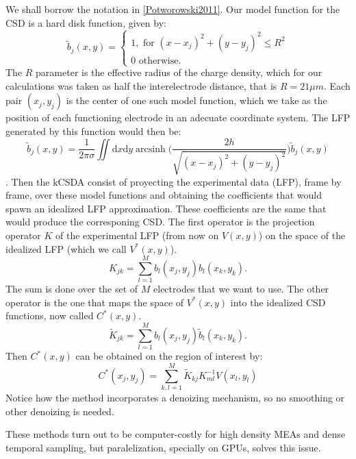 \documentclass{article}
\DeclareMathOperator{\arcsinh}{arcsinh}
\newcommand{\rd}{\mathrm{d}}
\begin{document}
We shall borrow the notation in \ref{Potworowski2011}. Our model function for the CSD is a hard disk function, given by:
\begin{equation}
  \tilde{b}_j(x,y)=\begin{cases}
  1, \text{ for } (x-x_j)^2+(y-y_j)^2 \leq R^2 \\
  0 \text{ otherwise.}
  \end{cases}
\end{equation}
The $R$ parameter is the effective radius of the charge density, which for our
calculations was taken as half the interelectrode distance, that is $R=21 \mu m$.
Each pair $(x_j, y_j)$ is the center of one such model function, which we take as
the position of each  functioning electrode in an adecuate coordinate system.
The LFP generated by this function would then be:
\begin{equation}
  \tilde{b}_j(x,y)=\frac{1}{2\pi\sigma}
  \iint \! \rd x \rd y \arcsinh \biggr(
  \frac{2 h } {\sqrt{(x-x_j)^2+(y-y_j)^2}}
  \biggl)
  \tilde{b}_j(x,y)
\end{equation}.
Then the kCSDA consist of proyecting the experimental data (LFP), frame by frame,
over these model functions and obtaining the  coefficients that would spawn an idealized
LFP approximation. These coefficients are the same that would produce the
corresponing CSD. The first operator is the projection operator $K$ of the experimental
LFP (from now on $V(x,y)$) on the space of the idealized LFP (which we call $V^* (x,y)$).
\begin{equation}
  K_{jk}=\sum_{l=1}^{M}b_l(x_j,y_j)b_l(x_k,y_k).
\end{equation}
The sum is done over the set of $M$ electrodes that we want to use.
The other operator is the one that maps the space of $V^*(x,y)$ into the idealized
CSD functions, now called $C^*(x,y)$. 
\begin{equation}
  \tilde{K}_{jk}=\sum_{l=1}^Mb_l(x_j,y_j)\tilde{b}_l(x_k,y_k).
\end{equation}
Then $C^*(x,y)$ can be obtained on the region of interest by:
\begin{equation}
  C^*(x_j,y_j)=\sum_{k,l=1}^M \tilde{K}_{kj} K^{-1}_{ml} V(x_l,y_l)
\end{equation}
Notice how the method incorporates a denoizing mechanism, so
no smoothing or other denoizing is needed. 



These methods turn out to be computer-costly for high density MEAs and dense temporal sampling, but paralelization, specially on
GPUs, solves this issue.
\end{document}
